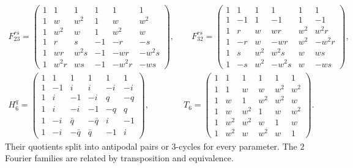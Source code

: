\documentclass[11pt,a4paper]{article}
\theoremstyle{plain}
\theoremstyle{definition}
\numberwithin{equation}{section}
\begin{document}
{\normalsize\setlength{\arraycolsep}{2.6pt}
\setlength{\abovedisplayskip}{6pt}\setlength{\belowdisplayskip}{6pt}
$$\begin{gathered}
F_{23}^{rs}=\begin{pmatrix}
1&1&1&1&1&1\\
1&w&w^2&1&w&w^2\\
1&w^2&w&1&w^2&w\\
1&r&s&-1&-r&-s\\
1&wr&w^2s&-1&-wr&-w^2s\\
1&w^2r&ws&-1&-w^2r&-ws
\end{pmatrix},\qquad F_{32}^{rs}=\begin{pmatrix}
1&1&1&1&1&1\\
1&-1&1&-1&1&-1\\
1&r&w&wr&w^2&w^2r\\
1&-r&w&-wr&w^2&-w^2r\\
1&s&w^2&w^2s&w&ws\\
1&-s&w^2&-w^2s&w&-ws
\end{pmatrix},\\[8pt]
H_6^q=\begin{pmatrix}
1&1&1&1&1&1\\
1&-1&i&i&-i&-i\\
1&i&-1&-i&q&-q\\
1&i&-i&-1&-q&q\\
1&-i&\bar{q}&-\bar{q}&i&-1\\
1&-i&-\bar{q}&\bar{q}&-1&i
\end{pmatrix},\qquad\qquad T_6=\begin{pmatrix}
1&1&1&1&1&1\\
1&1&w&w&w^2&w^2\\
1&w&1&w^2&w^2&w\\
1&w&w^2&1&w&w^2\\
1&w^2&w^2&w&1&w\\
1&w^2&w&w^2&w&1
\end{pmatrix}.
\end{gathered}$$
}
Their quotients split into antipodal pairs or $3$-cycles for every parameter. The $2$ Fourier families are related by transposition and equivalence.
\end{document}

